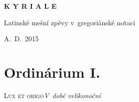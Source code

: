 \documentclass[12pt]{article} %
\newcommand{\info}[2]{\large\textsc{#1}\hfill{\em #2}}
\begin{document}
\begin{titlepage}
  \begin{center}

    { \vspace*{60 mm} }
    \begin{Huge}\textbf{K Y R I A L E}\end{Huge}

    \vspace{30 mm}
    \begin{Large}{Latinské mešní zpěvy v~gregoriánské notaci}\end{Large}

    \vspace{110 mm}
    \begin{large}{A.~D.~2015}\end{large}

  \end{center}
\end{titlepage}





\def\greinitialformat#1{{\fontsize{43}{43}\selectfont #1}}

\redlines






\section{Ordinárium I.}
\info{Lux et origo}{V~době velikonoční}

\vspace{0.5 cm}

\vspace{1 cm}

\vspace{1 cm}

\vspace{1 cm}
\end{document}
